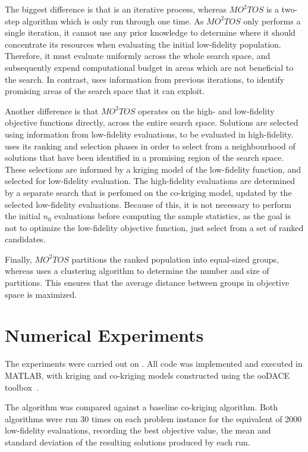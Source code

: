 \documentclass[journal]{IEEEtran}
\begin{document}
The biggest difference is that \AlgName{} is an iterative process, whereas $MO^2TOS$ is a two-step algorithm which is only run through one time. As $MO^2TOS$ only performs a single iteration, it cannot use any prior knowledge to determine where it should concentrate its resources when evaluating the initial low-fidelity population. Therefore, it must evaluate uniformly across the whole search space, and subsequently expend computational budget in areas which are not beneficial to the search. In contrast, \AlgName{} uses information from previous iterations, to identify promising areas of the search space that it can exploit.

Another difference is that $MO^2TOS$ operates on the high- and low-fidelity objective functions directly, across the entire search space. Solutions are selected using information from low-fidelity evaluations, to be evaluated in high-fidelity. \AlgName{} uses its ranking and selection phases in order to select from a neighbourhood of solutions that have been identified in a promising region of the search space. These selections are informed by a kriging model of the low-fidelity function, and selected for low-fidelity evaluation. The high-fidelity evaluations are determined by a separate search that is perfomed on the co-kriging model, updated by the selected low-fidelity evaluations. Because of this, it is not necessary to perform the initial $n_0$ evaluations before computing the sample statistics, as the goal is not to optimize the low-fidelity objective function, just select from a set of ranked candidates.

Finally, $MO^2TOS$ partitions the ranked population into equal-sized groups, whereas \AlgName{} uses a clustering algorithm to determine the number and size of partitions. This ensures that the average distance between groups in objective space is maximized.

\section{Numerical Experiments}\label{sec:exp}
The experiments were carried out on . All code was implemented and executed in MATLAB, with kriging and co-kriging models constructed using the ooDACE toolbox~\cite{oodace}.

The \AlgName{} algorithm was compared against a baseline co-kriging algorithm. Both algorithms were run 30 times on each problem instance for the equivalent of 2000 low-fidelity evaluations, recording the best objective value, the mean and standard deviation of the resulting solutions produced by each run.
\end{document}
